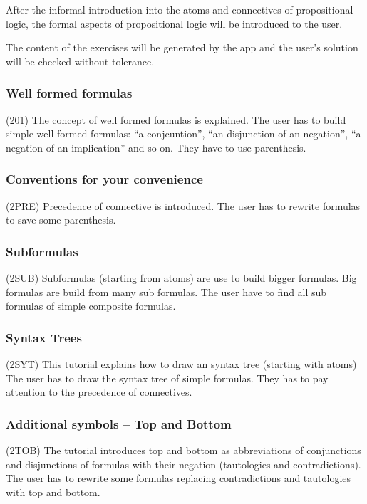 After the informal introduction into the atoms and connectives of propositional logic, 
the formal aspects of propositional logic will be introduced to the user.

The content of the exercises will be generated by the app and the user's solution will be checked without tolerance.


\subsubsection{Well formed formulas}
\label{tut:201}

(201) The concept of well formed formulas is explained. 
The user has to build simple well formed formulas: 
“a conjcuntion”, “an disjunction of an negation”, “a negation of an implication” and so on.
They have to use parenthesis.

\subsubsection{Conventions for your convenience}
\label{tut:2PRR}

(2PRE) Precedence of connective is introduced. 
The user has to rewrite formulas 
to save some parenthesis.

\subsubsection{Subformulas}
\label{tut:2SUB}

(2SUB) Subformulas (starting from atoms) are use to build bigger formulas. Big formulas are build from many sub formulas.
The user have to find all sub formulas of simple composite formulas.

\subsubsection{Syntax Trees}
\label{tut:2SYT}

(2SYT) This tutorial explains how to draw an syntax tree (starting with atoms)
The user has to draw the syntax tree of simple formulas. They has to pay attention to the precedence of connectives.

\subsubsection{Additional symbols – Top and Bottom}
\label{tut:2TOB}

(2TOB) The tutorial introduces top and bottom  
as abbreviations of conjunctions and disjunctions 
of formulas with their negation (tautologies and contradictions). 
The user has to rewrite some formulas replacing contradictions and tautologies with top and bottom.

